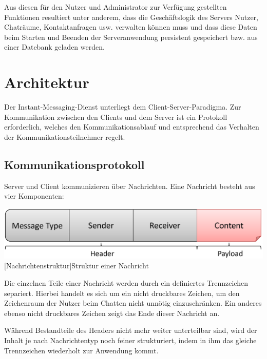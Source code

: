 \documentclass[12pt,a4paper,bibliography=totocnumbered,listof=totocnumbered]{scrartcl}
\begin{document}
Aus diesen für den Nutzer und Administrator zur Verfügung gestellten Funktionen resultiert unter anderem, dass die Geschäftslogik des Servers Nutzer, Chaträume, Kontaktanfragen usw. verwalten können muss und dass diese Daten beim Starten und Beenden der Serveranwendung persistent gespeichert bzw. aus einer Datebank geladen werden.

\newpage
\section{Architektur}
Der Instant-Messaging-Dienst unterliegt dem Client-Server-Paradigma. Zur Kommunikation zwischen den Clients und dem Server ist ein Protokoll erforderlich, welches den Kommunikationsablauf und entsprechend das Verhalten der Kommunikationsteilnehmer regelt.

\subsection{Kommunikationsprotokoll}
Server und Client kommunizieren über Nachrichten. Eine Nachricht besteht aus vier Komponenten:

\vspace{1em}
\begin{minipage}{\linewidth}
	\centering
	\includegraphics[width=0.7\linewidth]{img/Nachrichtenstruktur.png}
	[Nachrichtenstruktur]{Struktur einer Nachricht}
	\label{fig:Nachrichtenstruktur}
\end{minipage}
\vspace{0.5em}

Die einzelnen Teile einer Nachricht werden durch ein definiertes Trennzeichen separiert. Hierbei handelt es sich um ein nicht druckbares Zeichen, um den Zeichenraum der Nutzer beim Chatten nicht unnötig einzuschränken. Ein anderes ebenso nicht druckbares Zeichen zeigt das Ende dieser Nachricht an.

Während Bestandteile des Headers nicht mehr weiter unterteilbar sind, wird der Inhalt je nach Nachrichtentyp noch feiner strukturiert, indem in ihm das gleiche Trennzeichen wiederholt zur Anwendung kommt.
\end{document}
